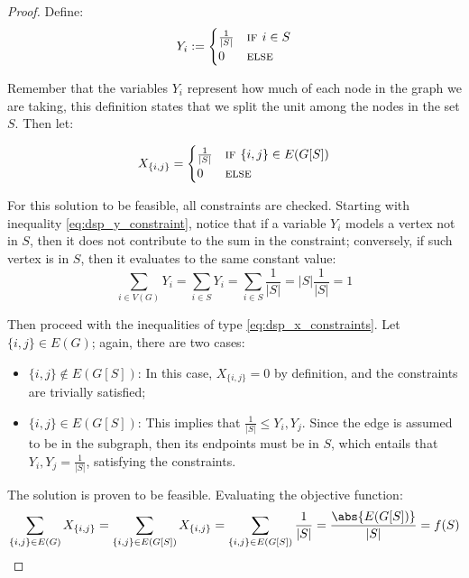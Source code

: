 \begin{proof}
    Define:
    \[
        Y_i := \begin{cases}
            \frac{1}{|S|}   & \textsc{if } i \in S \\
            0               & \textsc{else}
        \end{cases}
    \]
    
    Remember that the variables $Y_i$ represent how much of each node in the graph we are taking, this definition states that we split the unit among the nodes in the set $S$. Then let:
    
    \[
        X_{\{i, j\}} = \begin{cases}
            \frac{1}{|S|}   & \textsc{if } \{i, j\} \in E(G[S]) \\
            0               & \textsc{else}
        \end{cases}
    \]
    
    For this solution to be feasible, all constraints are checked. Starting with inequality \ref{eq:dsp_y_constraint}, notice that if a variable $Y_i$ models a vertex not in $S$, then it does not contribute to the sum in the constraint; conversely, if such vertex is in $S$, then it evaluates to the same constant value:
    \[
        \sum_{i \in V(G)} Y_i = \sum_{i \in S} Y_i = \sum_{i \in S} \frac{1}{|S|} = |S| \frac{1}{|S|} = 1
    \]
    
    Then proceed with the inequalities of type \ref{eq:dsp_x_constraints}. Let $\{i, j\} \in E(G)$; again, there are two cases:
    \begin{itemize}
        \item $\{i, j\} \not\in E(G[S])$: In this case, $X_{\{i, j\}} = 0$ by definition, and the constraints are trivially satisfied;
        
        \item $\{i, j\} \in E(G[S])$: This implies that $\frac{1}{|S|} \leq Y_i, Y_j$. Since the edge is assumed to be in the subgraph, then its endpoints must be in $S$, which entails that $Y_i, Y_j = \frac{1}{|S|}$, satisfying the constraints.
    \end{itemize}
    
    The solution is proven to be feasible. Evaluating the objective function:
    \[
        \sum_{\{i, j\} \in E(G)} X_{\{i, j\}} = \sum_{\{i, j\} \in E(G[S])} X_{\{i, j\}} = \sum_{\{i, j\} \in E(G[S])} \frac{1}{|S|} = \frac{\abs{E(G[S])}}{|S|} = f(S)
    \]
\end{proof}

